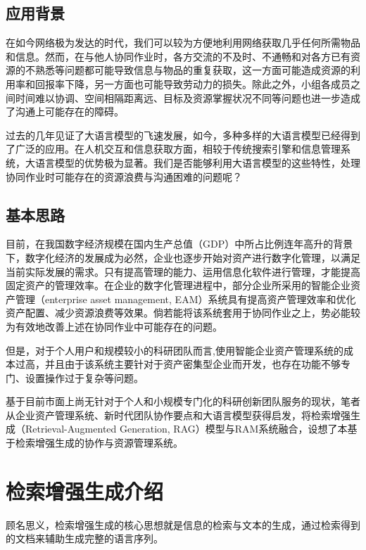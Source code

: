\documentclass[zihao=-4]{ctexart}
\begin{document}
\begin{spacing}{1.5}
\subsection {应用背景}
  在如今网络极为发达的时代，我们可以较为方便地利用网络获取几乎任何所需物品和信息。然而，在与他人协同作业时，各方交流的不及时、不通畅和对各方已有资源的不熟悉等问题都可能导致信息与物品的重复获取，这一方面可能造成资源的利用率和回报率下降，另一方面也可能导致劳动力的损失。除此之外，小组各成员之间时间难以协调、空间相隔距离远、目标及资源掌握状况不同等问题也进一步造成了沟通上可能存在的障碍。

过去的几年见证了大语言模型的飞速发展，如今，多种多样的大语言模型已经得到了广泛的应用。在人机交互和信息获取方面，相较于传统搜索引擎和信息管理系统，大语言模型的优势极为显著。我们是否能够利用大语言模型的这些特性，处理协同作业时可能存在的资源浪费与沟通困难的问题呢？
\subsection {基本思路}
  目前，在我国数字经济规模在国内生产总值（GDP）中所占比例连年高升的背景下，数字化经济的发展成为必然，企业也逐步开始对资产进行数字化管理，以满足当前实际发展的需求\cite{1}。只有提高管理的能力、运用信息化软件进行管理，才能提高固定资产的管理效率\cite{2}。在企业的数字化管理进程中，部分企业所采用的智能企业资产管理（enterprise asset management, EAM）系统具有提高资产管理效率和优化资产配置、减少资源浪费等效果。倘若能将该系统套用于协同作业之上，势必能较为有效地改善上述在协同作业中可能存在的问题。

但是，对于个人用户和规模较小的科研团队而言,使用智能企业资产管理系统的成本过高，并且由于该系统主要针对于资产密集型企业而开发，也存在功能不够专门、设置操作过于复杂等问题。

基于目前市面上尚无针对于个人和小规模专门化的科研创新团队服务的现状，笔者从企业资产管理系统、新时代团队协作要点和大语言模型获得启发，将检索增强生成（Retrieval-Augmented Generation, RAG）模型与RAM系统融合，设想了本基于检索增强生成的协作与资源管理系统。


\section{检索增强生成介绍}


  顾名思义，检索增强生成的核心思想就是信息的检索与文本的生成，通过检索得到的文档来辅助生成完整的语言序列。

\end{spacing}
\end{document}
